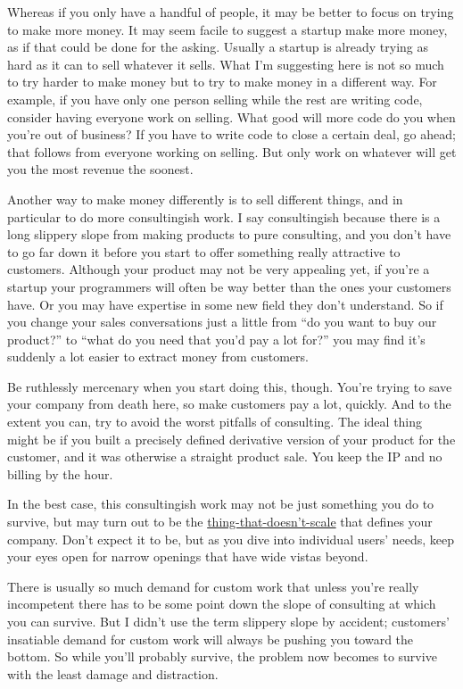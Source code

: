 \documentclass[12pt]{book}
\begin{document}
Whereas if you only have a handful of people, it may be better to focus
on trying to make more money. It may seem facile to suggest a startup
make more money, as if that could be done for the asking. Usually a
startup is already trying as hard as it can to sell whatever it sells.
What I'm suggesting here is not so much to try harder to make money but
to try to make money in a different way. For example, if you have only
one person selling while the rest are writing code, consider having
everyone work on selling. What good will more code do you when you're
out of business? If you have to write code to close a certain deal, go
ahead; that follows from everyone working on selling. But only work on
whatever will get you the most revenue the soonest.

Another way to make money differently is to sell different things, and
in particular to do more consultingish work. I say consultingish because
there is a long slippery slope from making products to pure consulting,
and you don't have to go far down it before you start to offer something
really attractive to customers. Although your product may not be very
appealing yet, if you're a startup your programmers will often be way
better than the ones your customers have. Or you may have expertise in
some new field they don't understand. So if you change your sales
conversations just a little from ``do you want to buy our product?'' to
``what do you need that you'd pay a lot for?'' you may find it's
suddenly a lot easier to extract money from customers.

Be ruthlessly mercenary when you start doing this, though. You're trying
to save your company from death here, so make customers pay a lot,
quickly. And to the extent you can, try to avoid the worst pitfalls of
consulting. The ideal thing might be if you built a precisely defined
derivative version of your product for the customer, and it was
otherwise a straight product sale. You keep the IP and no billing by the
hour.

In the best case, this consultingish work may not be just something you
do to survive, but may turn out to be the
\href{ds.html}{thing-that-doesn't-scale} that defines your company.
Don't expect it to be, but as you dive into individual users' needs,
keep your eyes open for narrow openings that have wide vistas beyond.

There is usually so much demand for custom work that unless you're
really incompetent there has to be some point down the slope of
consulting at which you can survive. But I didn't use the term slippery
slope by accident; customers' insatiable demand for custom work will
always be pushing you toward the bottom. So while you'll probably
survive, the problem now becomes to survive with the least damage and
distraction.
\end{document}
